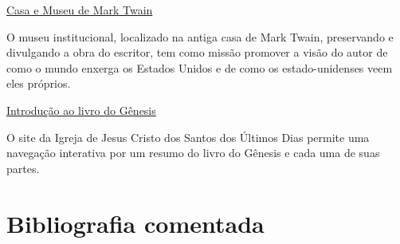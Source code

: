 \documentclass[12pt]{extarticle}
\begin{document}
\href{https://marktwainhouse.org/}{Casa e Museu de Mark Twain}

O museu institucional, localizado na antiga casa de Mark Twain, preservando e 
divulgando a obra do escritor, tem como missão promover a visão do autor de como 
o mundo enxerga os Estados Unidos e de como os estado-unidenses veem eles próprios. 

\href{https://www.churchofjesuschrist.org/study/manual/old-testament-seminary-teacher-manual/introduction-to-the-book-of-genesis?lang=por}{Introdução ao livro do Gênesis}

O site da Igreja de Jesus Cristo dos Santos dos Últimos Dias permite uma navegação interativa 
por um resumo do livro do Gênesis e cada uma de suas partes.

\section{Bibliografia comentada}
\end{document}
